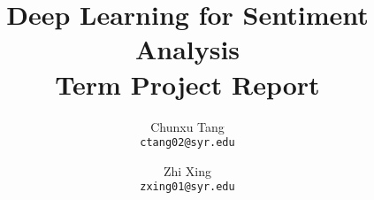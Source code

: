 \documentclass[11pt, letterpaper]{article}
\begin{document}
\title{Deep Learning for Sentiment Analysis\\
Term Project Report}
\author{Chunxu Tang\\
{\tt ctang02@syr.edu}
\and
Zhi Xing\\
{\tt zxing01@syr.edu}}
\date{}
\maketitle



\nocite{*}
{\fontsize{9pt}{10pt}\selectfont


}
\end{document}
